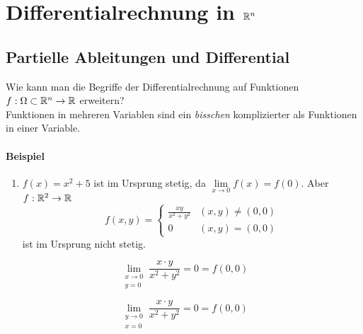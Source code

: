 \chapter{Differentialrechnung in $\R^{\lowercase{n}}$}
\section{Partielle Ableitungen und Differential}
Wie kann man die Begriffe der  Differentialrechnung auf Funktionen $f:\Omega \subset \mathbb{R}^n\to\mathbb{R}$ erweitern?\\

Funktionen in mehreren Variablen sind ein \emph{bisschen} komplizierter als Funktionen in einer Variable.
\subsubsection*{Beispiel}
\begin{enumerate}
\item $f(x)=x^2+5$ ist im Ursprung stetig, da $\lim\limits_{x\to 0}f(x)=f(0)$. Aber $f:\mathbb{R}^2\to\mathbb{R}$ \[f(x,y) = \left\{ {\begin{array}{*{20}{c}}
{\frac{xy}{{x^2} + {y^2}}}&{(x,y)\not  = (0,0)}\\
0&{(x,y) = (0,0)}
\end{array}} \right.\] ist im Ursprung nicht stetig. %
\end{enumerate}
\begin{figure}[ht]
\begin{minipage}[b]{0.45\linewidth}
\centering
\[\lim_{\substack{x \to 0 \\ y = 0}}{\frac{x \cdot y}{x^2 + y^2}} = 0 = f(0,0)\]
\end{minipage}
\hspace{0.5cm}
\begin{minipage}[b]{0.45\linewidth}
\centering
\[\lim_{\substack{y \to 0 \\ x = 0}}{\frac{x \cdot y}{x^2 + y^2} = 0 = f(0,0)}\]
\end{minipage}
\end{figure}

